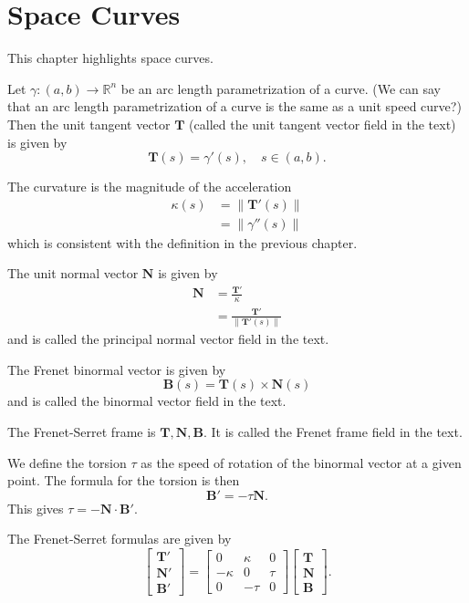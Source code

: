 \documentclass{book}
\begin{document}
	\chapter{Space Curves}
		This chapter highlights space curves.
		
		Let $\gamma:(a,b)\rightarrow\mathbb{R}^n$ be an arc length parametrization of a curve. (We can say that an arc length parametrization of a curve is the same as a unit speed curve?) Then the unit tangent vector $\mathbf{T}$ (called the unit tangent vector field in the text) is given by
		\begin{equation}
			\mathbf{T}(s)=\gamma'(s),\quad s\in(a,b)\mathrm{.}
		\end{equation}
		
		The curvature is the magnitude of the acceleration
		\begin{align}
			\kappa(s)&=\|\mathbf{T}'(s)\|\\
			&=\|\gamma''(s)\|
		\end{align}
		which is consistent with the definition in the previous chapter.
		
		The unit normal vector $\mathbf{N}$ is given by 
		\begin{align}
			\mathbf{N}&=\frac{\mathbf{T}'}{\kappa}\\
			&=\frac{\mathbf{T}'}{\|\mathbf{T}'(s)\|}
		\end{align}
		and is called the principal normal vector field in the text.
		
		The Frenet binormal vector is given by
		\begin{equation}
			\mathbf{B}(s)=\mathbf{T}(s)\times\mathbf{N}(s)
		\end{equation}
		and is called the binormal vector field in the text.
		
		The Frenet-Serret frame is ${\mathbf{T},\mathbf{N},\mathbf{B}}$. It is called the Frenet frame field in the text.
		
		We define the torsion $\tau$ as the speed of rotation of the binormal vector at a given point. The formula for the torsion is then
		\begin{equation}
			\mathbf{B}'=-\tau\mathbf{N}\mathrm{.}
		\end{equation}
		This gives $\tau=-\mathbf{N}\cdot\mathbf{B}'$.
		
		The Frenet-Serret formulas are given by
		\begin{equation}
			\begin{bmatrix}
				\mathbf{T}'\\
				\mathbf{N}'\\
				\mathbf{B}'
			\end{bmatrix}=
			\begin{bmatrix}
				0 & \kappa & 0\\
				-\kappa & 0 & \tau\\
				0 & -\tau & 0
			\end{bmatrix}
			\begin{bmatrix}
				\mathbf{T}\\
				\mathbf{N}\\
				\mathbf{B}
			\end{bmatrix}\mathrm{.}
		\end{equation}
		
\end{document}
